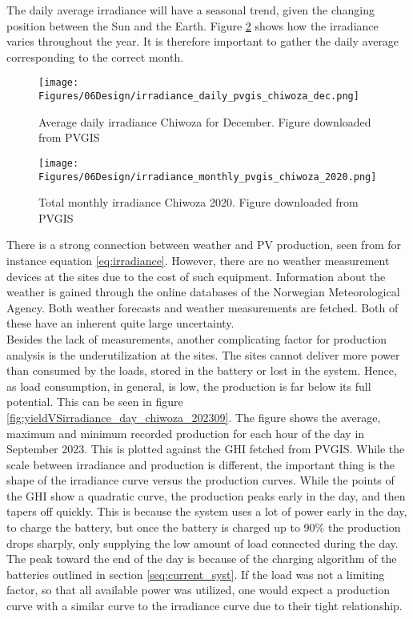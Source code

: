 The daily average irradiance will have a seasonal trend, given the changing position between the Sun and the Earth. Figure \ref{fig:irradiance_monthly_pvgis_chiwoza_2020} shows how the irradiance varies throughout the year. It is therefore important to gather the daily average corresponding to the correct month.

\begin{figure}
    \centering
    \texttt{[image: Figures/06Design/irradiance\_daily\_pvgis\_chiwoza\_dec.png]}
    \caption[Daily irradiance Chiwoza]{Average daily irradiance Chiwoza for December. Figure downloaded from PVGIS\cite{pvgis}}
    \label{fig:irradiance_daily_pvgis_chiwoza_dec}
\end{figure}

\begin{figure}
    \centering
    \texttt{[image: Figures/06Design/irradiance\_monthly\_pvgis\_chiwoza\_2020.png]}
    \caption[Monthly irradiance Chiwoza 2020]{Total monthly irradiance Chiwoza 2020. Figure downloaded from PVGIS\cite{pvgis}}
    \label{fig:irradiance_monthly_pvgis_chiwoza_2020}
\end{figure}

There is a strong connection between weather and PV production, seen from for instance equation \ref{eq:irradiance}. However, there are no weather measurement devices at the sites due to the cost of such equipment. Information about the weather is gained through the online databases of the Norwegian Meteorological Agency. Both weather forecasts and weather measurements are fetched. Both of these have an inherent quite large uncertainty.\\

Besides the lack of measurements, another complicating factor for production analysis is the underutilization at the sites. The sites cannot deliver more power than consumed by the loads, stored in the battery or lost in the system. Hence, as load consumption, in general, is low, the production is far below its full potential. This can be seen in figure \ref{fig:yieldVSirradiance_day_chiwoza_202309}. The figure shows the average, maximum and minimum recorded production for each hour of the day in September 2023. This is plotted against the GHI fetched from PVGIS\cite{pvgis}. While the scale between irradiance and production is different, the important thing is the shape of the irradiance curve versus the production curves. While the points of the GHI show a quadratic curve, the production peaks early in the day, and then tapers off quickly. This is because the system uses a lot of power early in the day, to charge the battery, but once the battery is charged up to 90\% the production drops sharply, only supplying the low amount of load connected during the day. The peak toward the end of the day is because of the charging algorithm of the batteries outlined in section \ref{seq:current_syst}. If the load was not a limiting factor, so that all available power was utilized, one would expect a production curve with a similar curve to the irradiance curve due to their tight relationship.

